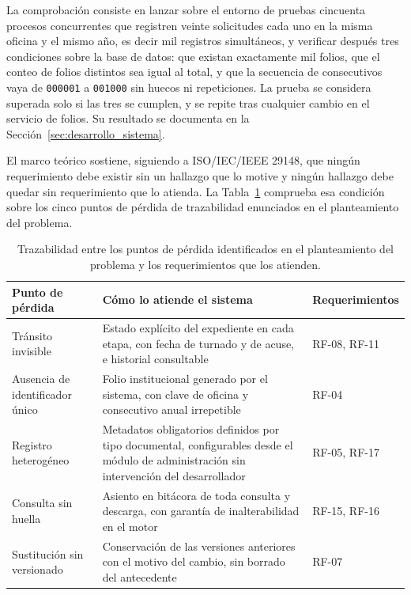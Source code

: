 La comprobación consiste en lanzar sobre el entorno de pruebas cincuenta procesos concurrentes que registren veinte solicitudes cada uno en la misma oficina y el mismo año, es decir mil registros simultáneos, y verificar después tres condiciones sobre la base de datos: que existan exactamente mil folios, que el conteo de folios distintos sea igual al total, y que la secuencia de consecutivos vaya de \texttt{000001} a \texttt{001000} sin huecos ni repeticiones. La prueba se considera superada solo si las tres se cumplen, y se repite tras cualquier cambio en el servicio de folios. Su resultado se documenta en la Sección~\ref{sec:desarrollo_sistema}.

El marco teórico sostiene, siguiendo a ISO/IEC/IEEE 29148, que ningún requerimiento debe existir sin un hallazgo que lo motive y ningún hallazgo debe quedar sin requerimiento que lo atienda. La Tabla~\ref{tab:trazabilidad} comprueba esa condición sobre los cinco puntos de pérdida de trazabilidad enunciados en el planteamiento del problema.

\begin{table}[H]
  \centering
  \small
  \renewcommand{\arraystretch}{1.3}
  \caption{Trazabilidad entre los puntos de pérdida identificados en el planteamiento del problema y los requerimientos que los atienden.}
  \label{tab:trazabilidad}
  \begin{tabularx}{\textwidth}{@{}>{\raggedright\arraybackslash}p{3.3cm}>{\raggedright\arraybackslash}X>{\raggedright\arraybackslash}p{3.1cm}@{}}
    \toprule
    \textbf{Punto de pérdida} & \textbf{Cómo lo atiende el sistema} & \textbf{Requerimientos} \\
    \midrule
    Tránsito invisible & Estado explícito del expediente en cada etapa, con fecha de turnado y de acuse, e historial consultable & RF-08, RF-11 \\
    Ausencia de identificador único & Folio institucional generado por el sistema, con clave de oficina y consecutivo anual irrepetible & RF-04 \\
    Registro heterogéneo & Metadatos obligatorios definidos por tipo documental, configurables desde el módulo de administración sin intervención del desarrollador & RF-05, RF-17 \\
    Consulta sin huella & Asiento en bitácora de toda consulta y descarga, con garantía de inalterabilidad en el motor & RF-15, RF-16 \\
    Sustitución sin versionado & Conservación de las versiones anteriores con el motivo del cambio, sin borrado del antecedente & RF-07 \\
    \bottomrule
  \end{tabularx}
\end{table}


